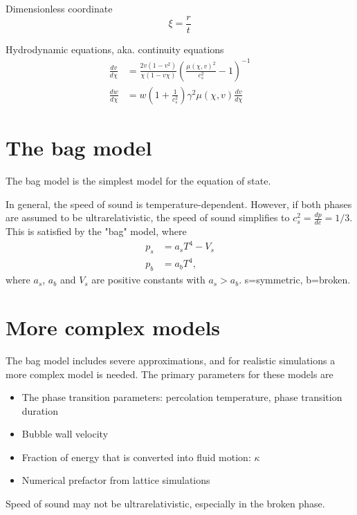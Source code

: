 Dimensionless coordinate
\begin{equation}
\xi = \frac{r}{t}
\end{equation}

Hydrodynamic equations, aka. continuity equations
\cites[eq. 7.30-7.31]{lecture_notes}[eq. 5]{giese_2021}
\begin{align}
\frac{dv}{d\chi} &= \frac{2v(1-v^2)}{\chi(1-v\chi)} \left( \frac{\mu(\chi,v)^2}{c_s^2} - 1 \right)^{-1} \\
\frac{dw}{d\chi} &= w \left( 1 + \frac{1}{c_s^2} \right) \gamma^2 \mu(\chi,v) \frac{dv}{d\chi}
\end{align}


\section{The bag model}
The bag model is the simplest model for the equation of state.

In general, the speed of sound is temperature-dependent.
However, if both phases are assumed to be ultrarelativistic, the speed of sound simplifies to $c_s^2 = \frac{dp}{de} = 1/3$.
This is satisfied by the "bag" model, where
\cites[eq. 7.33]{lecture_notes}[eq. 8-9]{giese_2020}
\begin{align}
p_s &= a_s T^4 - V_s
\label{eq:bag_ps} \\
p_b &= a_b T^4,
\label{eq:bag_pb}
\end{align}
where $a_s$, $a_b$ and $V_s$ are positive constants with $a_s > a_b$.
s=symmetric, b=broken.


\section{More complex models}
The bag model includes severe approximations, and for realistic simulations a more complex model is needed.
The primary parameters for these models are
\begin{itemize}
    \item The phase transition parameters: percolation temperature, phase transition duration
    \item Bubble wall velocity
    \item Fraction of energy that is converted into fluid motion: $\kappa$
    \item Numerical prefactor from lattice simulations
\end{itemize}

Speed of sound may not be ultrarelativistic, especially in the broken phase.

